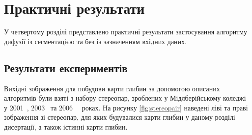 \chapter{Практичні результати}

У четвертому розділі представлено практичні результати
застосування алгоритму дифузії із сегментацією
та без із зазначенням вхідних даних.

\section{Результати експериментів}

Вихідні зображення для побудови карти глибин
за допомогою описаних алгоритмів були взяті з набору стереопар,
зроблених у Мідлберійському коледжі у 2001~\cite{middlebury:ds:2001},
2003~\cite{middlebury:ds:2003}
та 2006~\cite{middlebury:ds:2006:1}~\cite{middlebury:ds:2006:2} роках.
На рисунку \ref{fig:stereopair} наведені ліві та праві зображення зі стереопар,
для яких будувалися карти глибин у даному розділі дисертації,
а також істинні карти глибин.

